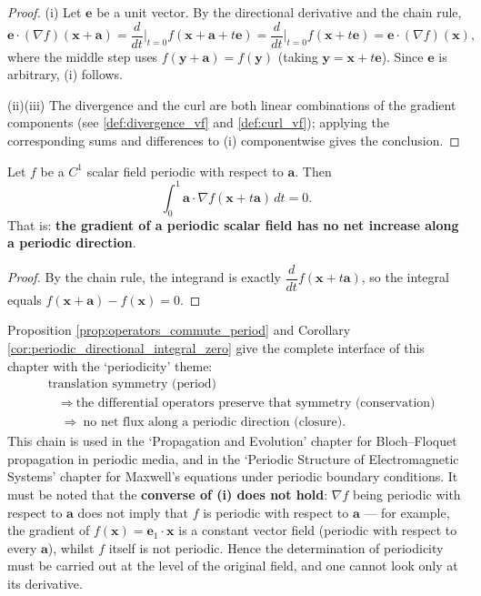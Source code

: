 \begin{proof}
(i) Let $\mathbf e$ be a unit vector. By the directional derivative and the chain rule,
\[
\mathbf e\cdot(\nabla f)(\mathbf x+\mathbf a)
=\frac{d}{dt}\Big|_{t=0}f(\mathbf x+\mathbf a+t\mathbf e)
=\frac{d}{dt}\Big|_{t=0}f(\mathbf x+t\mathbf e)
=\mathbf e\cdot(\nabla f)(\mathbf x),
\]
where the middle step uses $f(\mathbf y+\mathbf a)=f(\mathbf y)$ (taking $\mathbf y=\mathbf x+t\mathbf e$). Since $\mathbf e$ is arbitrary, (i) follows.

(ii)(iii) The divergence and the curl are both linear combinations of the gradient components (see \cref{def:divergence_vf} and \cref{def:curl_vf}); applying the corresponding sums and differences to (i) componentwise gives the conclusion.
\end{proof}

\begin{corollary}\label{cor:periodic_directional_integral_zero}
Let $f$ be a $C^1$ scalar field periodic with respect to $\mathbf a$. Then
\[
\int_0^{1}\mathbf a\cdot\nabla f(\mathbf x+t\mathbf a)\,dt=0 .
\]
That is: \textbf{the gradient of a periodic scalar field has no net increase along a periodic direction}.
\end{corollary}

\begin{proof}
By the chain rule, the integrand is exactly $\dfrac{d}{dt}f(\mathbf x+t\mathbf a)$, so the integral equals $f(\mathbf x+\mathbf a)-f(\mathbf x)=0$.
\end{proof}

\begin{remark}\label{rem:vf_period_interface}
Proposition \ref{prop:operators_commute_period} and Corollary \ref{cor:periodic_directional_integral_zero} give the complete interface of this chapter with the `periodicity' theme:
\[
\begin{aligned}
&\text{translation symmetry (period)}\\
&\quad\Longrightarrow\ \text{the differential operators preserve that symmetry (conservation)}\\
&\quad\Longrightarrow\ \text{no net flux along a periodic direction (closure)}.
\end{aligned}
\]
This chain is used in the `Propagation and Evolution' chapter for Bloch--Floquet propagation in periodic media, and in the `Periodic Structure of Electromagnetic Systems' chapter for Maxwell's equations under periodic boundary conditions.
It must be noted that the \textbf{converse of (i) does not hold}: $\nabla f$ being periodic with respect to $\mathbf a$ does not imply that $f$ is periodic with respect to $\mathbf a$ --- for example, the gradient of $f(\mathbf x)=\mathbf e_1\cdot\mathbf x$ is a constant vector field (periodic with respect to every $\mathbf a$), whilst $f$ itself is not periodic. Hence the determination of periodicity must be carried out at the level of the original field, and one cannot look only at its derivative.
\end{remark}

